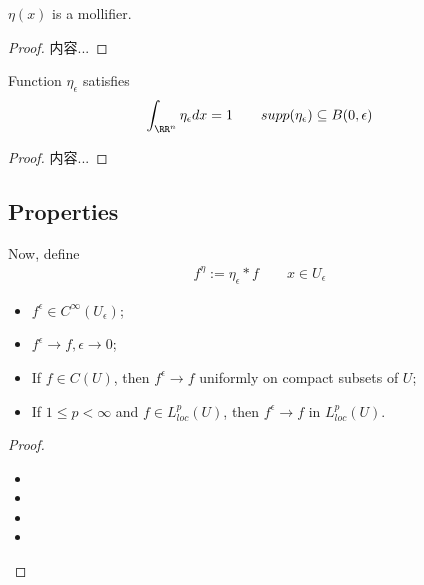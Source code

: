 \documentclass[Total.tex]{subfiles}
\begin{document}
				\begin{proposition}
					$\eta(x)$ is a mollifier.
				\end{proposition}
				\begin{proof}
					内容...
				\end{proof}
				
				\begin{proposition}
					Function $\eta_\epsilon$ satisfies 
					\begin{gather*}
						\int_{\RR^n} \eta_\epsilon dx=1\qquad supp(\eta_\epsilon)\subseteq B(0,\epsilon)
					\end{gather*}
					
				\end{proposition}
				\begin{proof}
					内容...
				\end{proof}
				\subsection{Properties}
				
				\begin{Def}
					Now, define
					\begin{gather*}
						f^\eta:=\eta_\epsilon*f\qquad x\in U_\epsilon
					\end{gather*}
				\end{Def}
				
				\begin{proposition}
					\begin{itemize}
						\item $f^\epsilon\in C^\infty(U_\epsilon)$;
						\item $f^\epsilon\rightarrow f,\epsilon\rightarrow 0$;
						\item If $f\in C(U)$, then $f^\epsilon\rightarrow f$ uniformly on compact subsets of $U$;
						\item If $1\leq p<\infty$ and $f\in L_{loc}^p(U)$, then $f^\epsilon\rightarrow f$ in $L_{loc}^p(U)$.
					\end{itemize}
				\end{proposition}
				\begin{proof}
					\begin{itemize}
						\item 
						\item 
						\item 
						\item 
					\end{itemize}
				\end{proof}
\end{document}
